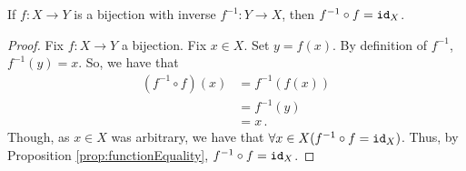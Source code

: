 \guard






\begin{prop}
\label{prop:inverseOfFunction}
  If $f:X\to Y$ is a bijection with inverse $f^{-1}:Y\to X$, then $f^{-1}\circ f=\texttt{id}_X$.
\end{prop}
\begin{proof}
  Fix $f:X\to Y$ a bijection.
  Fix $x\in X$.
  Set $y=f(x)$.
  By definition of $f^{-1}$, $f^{-1}(y) = x$.
  So, we have that
  \begin{align*}
    (f^{-1}\circ f )(x) &= f^{-1}(f(x)) \\
                        &= f^{-1}(y) \\
                        &= x\,.
  \end{align*}
  Though, as $x\in X$ was arbitrary, we have that $\forall x\in X( f^{-1}\circ f=\texttt{id}_X)$.
  Thus, by Proposition \ref{prop:functionEquality}, $f^{-1}\circ f=\texttt{id}_X$.
\end{proof}

